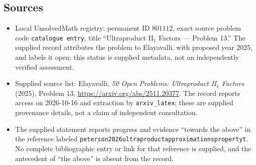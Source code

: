 \documentclass[11pt]{article}
\begin{document}
\subsection{Sources}
\begin{itemize}
\item Local UnsolvedMath registry: permanent ID \(801112\), exact source problem code \texttt{catalogue entry}, title ``Ultraproduct II\(_1\) Factors --- Problem 13.'' The supplied record attributes the problem to Elayavalli, with proposed year 2025, and labels it open; this status is supplied metadata, not an independently verified assessment.
\item Supplied source list: Elayavalli, \emph{50 Open Problems: Ultraproduct II\(_1\) Factors} (2025), Problem 13, \url{https://arxiv.org/abs/2511.20377}. The record reports access on 2026-10-16 and extraction by \texttt{arxiv\_latex}; these are supplied provenance details, not a claim of independent consultation.
\item The supplied statement reports progress and evidence ``towards the above'' in the reference labeled \texttt{peterson2026ultraproductapproximationspropertyt}. No complete bibliographic entry or link for that reference is supplied, and the antecedent of ``the above'' is absent from the record.
\end{itemize}
\end{document}
